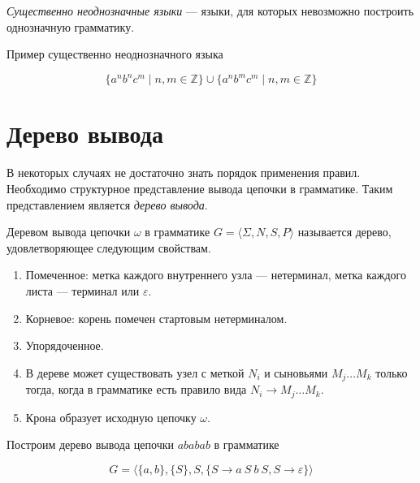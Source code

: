 \begin{definition}
  \textit{Существенно неоднозначные языки} --- языки, для которых невозможно построить однозначную грамматику.
\end{definition}

\begin{example}
  Пример существенно неоднозначного языка

\[\{a^n b^n c^m \mid n, m \in \mathds{Z}\} \cup \{a^n b^m c^m \mid n,m \in \mathds{Z}\}\]
\end{example}

\section{Дерево вывода}\label{sect:DerivTree}
В некоторых случаях не достаточно знать порядок применения правил.
Необходимо структурное представление вывода цепочки в грамматике.
Таким представлением является \textit{дерево вывода}.
\begin{definition}
Деревом вывода цепочки $\omega$ в грамматике $G=\langle \Sigma, N, S, P \rangle$ называется дерево, удовлетворяющее следующим свойствам.

\begin{enumerate}
  \item Помеченное: метка каждого внутреннего узла --- нетерминал, метка каждого листа --- терминал или $\varepsilon$.
  \item Корневое: корень помечен стартовым нетерминалом.
  \item Упорядоченное.
  \item В дереве может существовать узел с меткой $N_i$ и сыновьями $M_j \dots M_k$ только тогда, когда в грамматике есть правило вида $N_i \to M_j \dots M_k$.
  \item Крона образует исходную цепочку $\omega$.
\end{enumerate}
\end{definition}

\begin{example}
  Построим дерево вывода цепочки $ababab$ в грамматике

  \[ G = \langle \{a,b\}, \{S\}, S, \{S \to a \ S \ b \ S, S \to \varepsilon\} \rangle \]

\begin{center}
  
\end{center}

\end{example}

